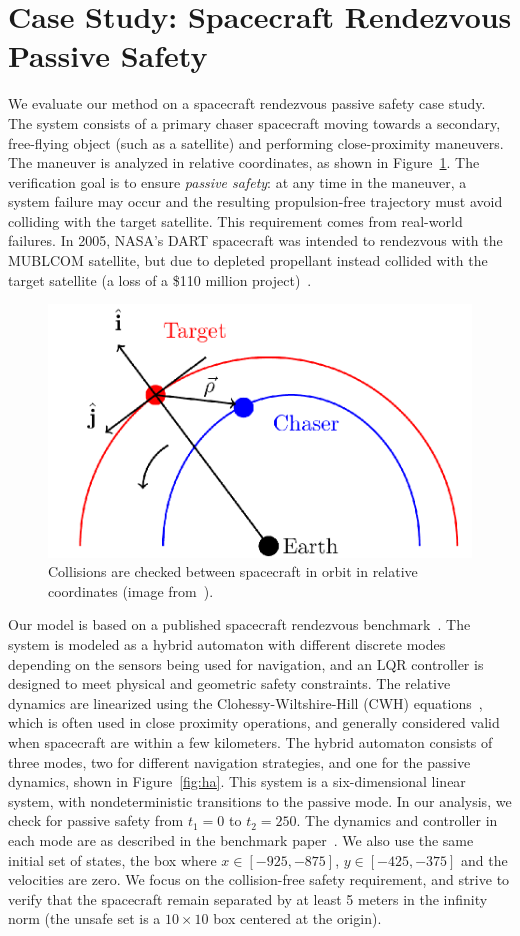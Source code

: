 \section{Case Study: Spacecraft Rendezvous Passive Safety}
\label{sec:casestudy}

We evaluate our method on a spacecraft rendezvous passive safety case study.
%
The system consists of a primary chaser spacecraft moving towards a secondary, free-flying object (such as a satellite) and performing close-proximity maneuvers.
%
The maneuver is analyzed in relative coordinates, as shown in Figure~\ref{fig:chaser}.
%
The verification goal is to ensure \emph{passive safety}: at any time in the maneuver, a system failure may occur and the resulting propulsion-free trajectory must avoid colliding with the target satellite.
%
This requirement comes from real-world failures. In 2005, NASA's DART spacecraft was intended to rendezvous with the MUBLCOM satellite, but due to depleted propellant instead collided with the target satellite (a loss of a
\$110 million project)~\cite{croomes2006overview}.

\begin{figure}[t]
\centerline{\includegraphics[width=0.5\columnwidth]{images/chaser.png}}
\caption{Collisions are checked between spacecraft in orbit in relative coordinates (image from~\cite{chan2017verifying}).}
\label{fig:chaser}
\end{figure}


Our model is based on a published spacecraft rendezvous benchmark~\cite{chan2017verifying,jewison2016spacecraft}.
%
The system is modeled as a hybrid automaton with different discrete modes depending on the sensors being used for navigation, and an LQR controller is designed to meet physical and geometric safety constraints.
%
The relative dynamics are linearized using the Clohessy-Wiltshire-Hill (CWH) equations~\cite{wh1960terminal},
which is often used in close proximity operations, and generally considered valid when spacecraft are within a few kilometers.
%
The hybrid automaton consists of three modes, two for different navigation strategies, and one for the passive dynamics, shown in Figure~\ref{fig:ha}.
%
This system is a six-dimensional linear system, with nondeterministic transitions to the passive mode.
%
In our analysis, we check for passive safety from $t_1=0$ to $t_2=250$.
%
The dynamics and controller in each mode are as described in the benchmark paper~\cite{chan2017verifying}.
%
We also use the same initial set of states, the box where $x \in [-925, -875]$, $y \in [-425, -375]$ and the velocities are zero.
%
We focus on the collision-free safety requirement, and strive to verify that the spacecraft remain separated by at least
5 meters in the infinity norm (the unsafe set is a $10 \times 10$ box centered at the origin).

